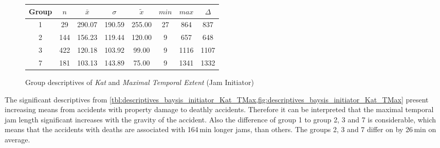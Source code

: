 \begin{figure}[ht!]
	\centering
	\begin{minipage}{0.5\textwidth}
		\tiny
		\setlength{\tabcolsep}{4pt}
		\centering
		\begin{tabular}{c|c|c|c|c|c|c|c}
			\toprule
			Group & $n$ & $\bar{x}$ & $\sigma$ & $\tilde{x}$ & $min$ & $max$ & $\Delta$ \\
			\midrule
            1 & 29  & 290.07 & 190.59 & 255.00 & 27 & 864  & 837 \\ 
            2 & 144 & 156.23 & 119.44 & 120.00 & 9  & 657  & 648 \\ 
            3 & 422 & 120.18 & 103.92 & 99.00  & 9  & 1116 & 1107 \\ 
            7 & 181 & 103.13 & 143.89 & 75.00  & 9  & 1341 & 1332 \\ 
			\bottomrule
		\end{tabular}
		\label{tbl:descriptives_baysis_initiator_Kat_TMax}
	\end{minipage}%
	\begin{minipage}{0.55\textwidth}
		\data
        \pgfplotstablesort[sort key=mean, sort cmp=float >]{\datasorted}{\data}
        \tiny
        \centering
		\label{fig:descriptives_baysis_initiator_Kat_TMax}
	\end{minipage}%
	\caption{Group descriptives of \textit{Kat} and \textit{Maximal Temporal Extent} (Jam Initiator)}
\end{figure}
The significant descriptives from \cref{tbl:descriptives_baysis_initiator_Kat_TMax,fig:descriptives_baysis_initiator_Kat_TMax} present increasing means from accidents with property damage to deathly accidents. Therefore it can be interpreted that the maximal temporal jam length significant increases with the gravity of the accident. Also the difference of group 1 to group 2, 3 and 7 is considerable, which means that the accidents with deaths are associated with 164\,min longer jams, than others. The groups 2, 3 and 7 differ on by 26\,min on average. 
